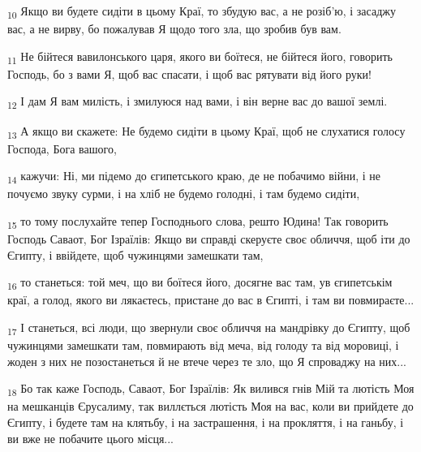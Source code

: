 \begin{tcolorbox}
\textsubscript{10} Якщо ви будете сидіти в цьому Краї, то збудую вас, а не розіб'ю, і засаджу вас, а не вирву, бо пожалував Я щодо того зла, що зробив був вам.
\end{tcolorbox}
\begin{tcolorbox}
\textsubscript{11} Не бійтеся вавилонського царя, якого ви боїтеся, не бійтеся його, говорить Господь, бо з вами Я, щоб вас спасати, і щоб вас рятувати від його руки!
\end{tcolorbox}
\begin{tcolorbox}
\textsubscript{12} І дам Я вам милість, і змилуюся над вами, і він верне вас до вашої землі.
\end{tcolorbox}
\begin{tcolorbox}
\textsubscript{13} А якщо ви скажете: Не будемо сидіти в цьому Краї, щоб не слухатися голосу Господа, Бога вашого,
\end{tcolorbox}
\begin{tcolorbox}
\textsubscript{14} кажучи: Ні, ми підемо до єгипетського краю, де не побачимо війни, і не почуємо звуку сурми, і на хліб не будемо голодні, і там будемо сидіти,
\end{tcolorbox}
\begin{tcolorbox}
\textsubscript{15} то тому послухайте тепер Господнього слова, решто Юдина! Так говорить Господь Саваот, Бог Ізраїлів: Якщо ви справді скеруєте своє обличчя, щоб іти до Єгипту, і ввійдете, щоб чужинцями замешкати там,
\end{tcolorbox}
\begin{tcolorbox}
\textsubscript{16} то станеться: той меч, що ви боїтеся його, досягне вас там, ув єгипетськім краї, а голод, якого ви лякаєтесь, пристане до вас в Єгипті, і там ви повмираєте...
\end{tcolorbox}
\begin{tcolorbox}
\textsubscript{17} І станеться, всі люди, що звернули своє обличчя на мандрівку до Єгипту, щоб чужинцями замешкати там, повмирають від меча, від голоду та від моровиці, і жоден з них не позостанеться й не втече через те зло, що Я спроваджу на них...
\end{tcolorbox}
\begin{tcolorbox}
\textsubscript{18} Бо так каже Господь, Саваот, Бог Ізраїлів: Як вилився гнів Мій та лютість Моя на мешканців Єрусалиму, так виллється лютість Моя на вас, коли ви прийдете до Єгипту, і будете там на клятьбу, і на застрашення, і на прокляття, і на ганьбу, і ви вже не побачите цього місця...
\end{tcolorbox}
